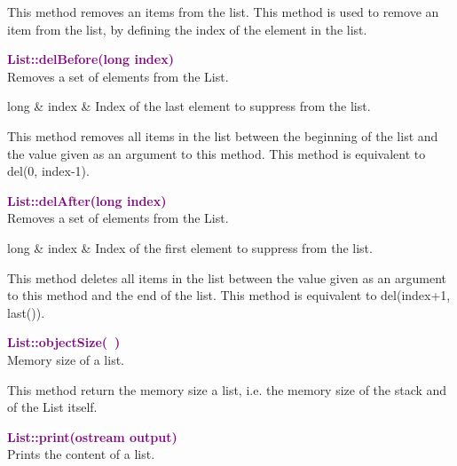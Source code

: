 This method removes an items from the list.
This method is used to remove an item from the list, by defining the index of the element in the list.

\textcolor{purple}{\textbf{List::delBefore(long index)}}\label{List::delBefore(long index)}\\
Removes a set of elements from the List.

\begin{tcolorbox}[width=\textwidth,myArgs,tabularx={ll|R}]
long & index & Index of the last element to suppress from the list.
\end{tcolorbox}

This method removes all items in the list between the beginning of the list and the value given as an argument to this method.
This method is equivalent to del(0, index-1).

\textcolor{purple}{\textbf{List::delAfter(long index)}}\label{List::delAfter(long index)}\\
Removes a set of elements from the List.

\begin{tcolorbox}[width=\textwidth,myArgs,tabularx={ll|R}]
long & index & Index of the first element to suppress from the list.
\end{tcolorbox}

This method deletes all items in the list between the value given as an argument to this method and the end of the list.
This method is equivalent to del(index+1, last()).

\textcolor{purple}{\textbf{List::objectSize(~)}}\label{List::objectSize()}\\
Memory size of a list.

This method return the memory size a list, i.e. the memory size of the stack and of the List itself.

\textcolor{purple}{\textbf{List::print(ostream output)}}\label{List::print(ostream output)}\\
Prints the content of a list.

